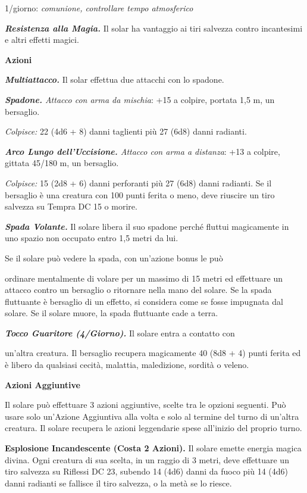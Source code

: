 \begin{multicols}{2}
1/giorno: \emph{comunione, controllare tempo atmosferico}

\emph{\textbf{Resistenza alla Magia.}} Il solar ha vantaggio ai tiri
salvezza contro incantesimi e altri effetti magici.

\textbf{Azioni}

\emph{\textbf{Multiattacco.}} Il solar effettua due attacchi con lo
spadone.

\emph{\textbf{Spadone.} Attacco con arma da mischia}: +15 a colpire,
portata 1,5 m, un bersaglio.

\emph{Colpisce:} 22 (4d6 + 8) danni taglienti più 27 (6d8) danni
radianti.

\emph{\textbf{Arco Lungo dell'Uccisione.} Attacco con arma a distanza}:
+13 a colpire, gittata 45/180 m, un bersaglio.

\emph{Colpisce:} 15 (2d8 + 6) danni perforanti più 27 (6d8) danni
radianti. Se il bersaglio è una creatura con 100 punti ferita o meno,
deve riuscire un tiro salvezza su Tempra DC 15 o morire.

\emph{\textbf{Spada Volante.}} Il solare libera il suo spadone perché
fluttui magicamente in uno spazio non occupato entro 1,5 metri da lui.

Se il solare può vedere la spada, con un'azione bonus le può

ordinare mentalmente di volare per un massimo di 15 metri ed effettuare
un attacco contro un bersaglio o ritornare nella mano del solare. Se la
spada fluttuante è bersaglio di un effetto, si considera come se fosse
impugnata dal solare. Se il solare muore, la spada fluttuante cade a
terra.

\emph{\textbf{Tocco Guaritore (4/Giorno).}} Il solare entra a contatto
con

un'altra creatura. Il bersaglio recupera magicamente 40 (8d8 + 4) punti
ferita ed è libero da qualsiasi cecità, malattia, maledizione, sordità o
veleno.

\textbf{Azioni Aggiuntive}

Il solare può effettuare 3 azioni aggiuntive, scelte tra le opzioni
seguenti. Può usare solo un'Azione Aggiuntiva alla volta e solo al
termine del turno di un'altra creatura. Il solare recupera le azioni
leggendarie spese all'inizio del proprio turno.

\textbf{Esplosione Incandescente (Costa 2 Azioni).} Il solare emette
energia magica divina. Ogni creatura di sua scelta, in un raggio di 3
metri, deve effettuare un tiro salvezza su Riflessi DC 23, subendo 14
(4d6) danni da fuoco più 14 (4d6) danni radianti se fallisce il tiro
salvezza, o la metà se lo riesce.


\end{multicols}
